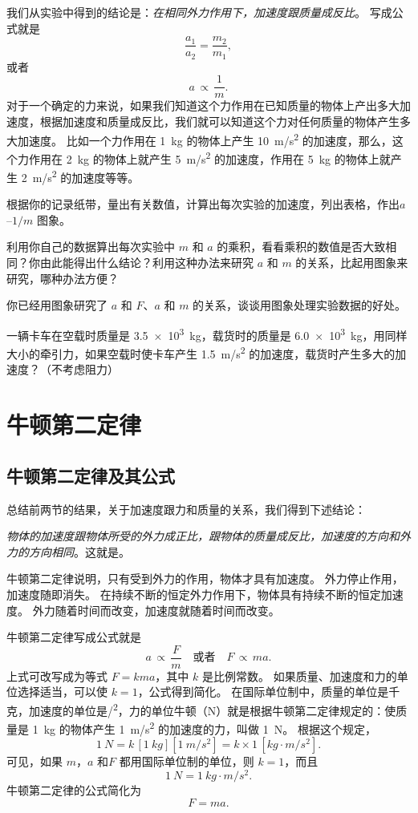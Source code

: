 我们从实验中得到的结论是：\emph{在相同外力作用下，加速度跟质量成反比}。
写成公式就是
\[\frac{a_1}{a_2}=\frac{m_2}{m_1},\]
或者
\[a\,\propto\, \frac{1}{m}.\]
对于一个确定的力来说，如果我们知道这个力作用在已知质量的物体上产出多大加速度，根据加速度和质量成反比，我们就可以知道这个力对任何质量的物体产生多大加速度。
比如一个力作用在 \qty{1}{kg} 的物体上产生 \qty{10}{m/s^2} 的加速度，那么，这个力作用在 \qty{2}{kg} 的物体上就产生 \qty{5}{m/s^2} 的加速度，作用在 \qty{5}{kg} 的物体上就产生 \qty{2}{m/s^2} 的加速度等等。

\begin{Practice}
\begin{question}
  \item 根据你的记录纸带，量出有关数值，计算出每次实验的加速度，列出表格，作出$a$--$1/m$ 图象。
  \item 利用你自己的数据算出每次实验中 $m$ 和 $a$ 的乘积，看看乘积的数值是否大致相同？你由此能得出什么结论？利用这种办法来研究 $a$ 和 $m$ 的关系，比起用图象来研究，哪种办法方便？
  \item 你已经用图象研究了 $a$ 和 $F$、$a$ 和 $m$ 的关系，谈谈用图象处理实验数据的好处。
  \item 一辆卡车在空载时质量是 \qty{3.5e3}{kg}，载货时的质量是 \qty{6.0e3}{kg}，用同样大小的牵引力，如果空载时使卡车产生 \qty{1.5}{m/s^2} 的加速度，载货时产生多大的加速度？（不考虑阻力）
\end{question}
\end{Practice}

\section{牛顿第二定律}
\subsection{牛顿第二定律及其公式}
总结前两节的结果，关于加速度跟力和质量的关系，我们得到下述结论：

\emph{物体的加速度跟物体所受的外力成正比，跟物体的质量成反比，加速度的方向和外力的方向相同}。这就是。

牛顿第二定律说明，只有受到外力的作用，物体才具有加速度。
外力停止作用，加速度随即消失。
在持续不断的恒定外力作用下，物体具有持续不断的恒定加速度。
外力随着时间而改变，加速度就随着时间而改变。

牛顿第二定律写成公式就是
\[a\,\propto\,\frac{F}{m}\quad \text{或者}\quad F\,\propto\,ma. \]
上式可改写成为等式 $F=kma$，其中 $k$ 是比例常数。
如果质量、加速度和力的单位选择适当，可以使 $k=1$，公式得到简化。
在国际单位制中，质量的单位是千克，加速度的单位是\unit{/^2}，力的单位牛顿（\unit{N}）就是根据牛顿第二定律规定的：使质量是 \qty{1}{kg} 的物体产生 \qty{1}{m/s^2} 的加速度的力，叫做 \qty{1}{N}。
根据这个规定，
\[\qty{1}{N}=k\,[\qty{1}{kg}][\qty{1}{m/s^2} ]=k\times 1\,[\unit{kg\cdot m/s^2} ].\]
可见，如果 $m$，$a$ 和$ F$ 都用国际单位制的单位，则 $k=1$，而且
\[\qty{1}{N}=\qty{1}{kg\cdot m/s^2}.\]
牛顿第二定律的公式简化为
\[F=ma.\]

